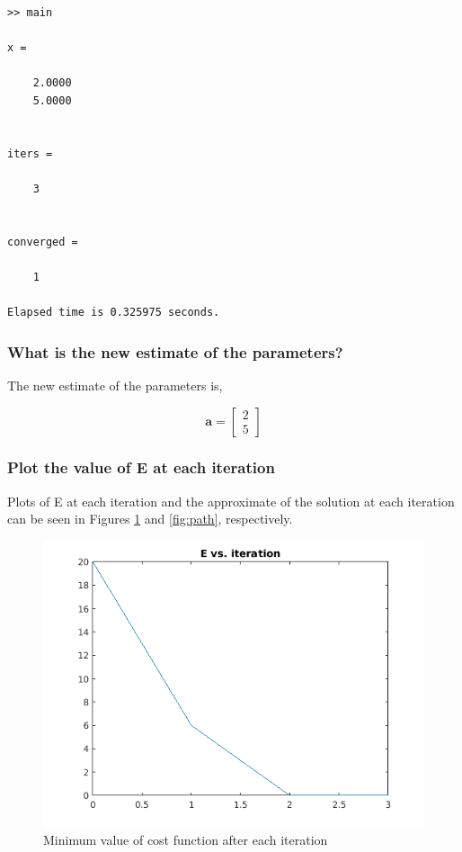 \documentclass{article}
\begin{document}
\vspace{0.25in}

\begin{verbatim}
>> main

x =

	2.0000
	5.0000


iters =

	3


converged =

	1

Elapsed time is 0.325975 seconds.

\end{verbatim}

\vspace{0.25in}

\subsubsection{What is the new estimate of the parameters?}

The new estimate of the parameters is,

\begin{equation*}
\mathbf{a} = \begin{bmatrix} 2 \\ 5 \end{bmatrix}
\end{equation*}

\subsubsection{Plot the value of E at each iteration}

Plots of E at each iteration and the approximate of the solution at each iteration can be seen in Figures \ref{fig:error} and \ref{fig:path}, respectively.

\begin{figure}
	\centering
	\includegraphics[width=0.75\linewidth]{E-vs-iteration}
	\caption{Minimum value of cost function after each iteration}
	\label{fig:error}
\end{figure}
\end{document}
